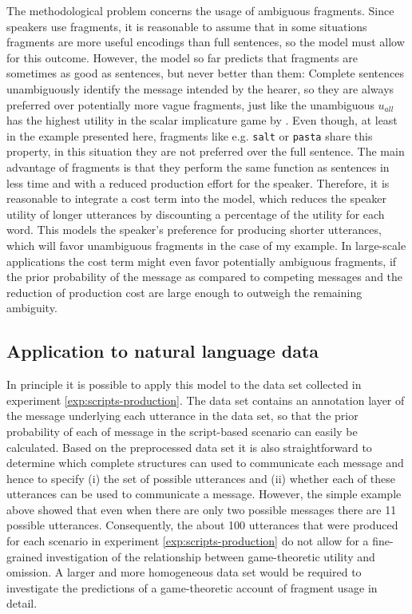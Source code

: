 The methodological problem concerns the usage of ambiguous fragments. Since speakers use fragments, it is reasonable to assume that in some situations fragments are more useful encodings than full sentences, so the model must allow for this outcome. However, the model so far predicts that fragments are sometimes as good as sentences, but never better than them: Complete sentences unambiguously identify the message intended by the hearer, so they are always preferred over potentially more vague fragments, just like the unambiguous $u_{all}$ has the highest utility in the scalar implicature game by \citet{franke2009}. Even though, at least in the example presented here, fragments like e.g. \texttt{salt} or \texttt{pasta} share this property, in this situation they are not preferred over the full sentence. The main advantage of fragments is that they perform the same function as sentences in less time and with a reduced production effort for the speaker. Therefore, it is reasonable to integrate a cost term into the model, which reduces the speaker utility of longer utterances by discounting a percentage of the utility for each word. This models the speaker's preference for producing shorter utterances, which will favor unambiguous fragments in the case of my example. In large-scale applications the cost term might even favor potentially ambiguous fragments, if the prior probability of the message as compared to competing messages and the reduction of production cost are large enough to outweigh the remaining ambiguity.

\subsection{Application to natural language data}
In principle it is possible to apply this model to the data set collected in experiment \ref{exp:scripts-production}. The data set contains an annotation layer of the message underlying each utterance in the data set, so that the prior probability of each of message in the script-based scenario can easily be calculated. Based on the preprocessed data set it is also straightforward to determine which complete structures can used to communicate each message and hence to specify (i) the set of possible utterances and (ii) whether each of these utterances can be used to communicate a message. However, the simple example above showed that even when there are only two possible messages there are 11 possible utterances. Consequently, the about 100 utterances that were produced for each scenario in experiment \ref{exp:scripts-production} do not allow for a fine-grained investigation of the relationship between game-theoretic utility and omission. A larger and more homogeneous data set would be required to investigate the predictions of a game-theoretic account of fragment usage in detail.

